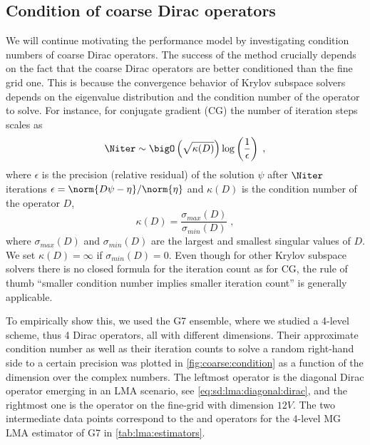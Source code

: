 \subsection{Condition of coarse Dirac operators}
\label{sec:numerics:coarse:condition}

We will continue motivating the performance model by investigating condition numbers of coarse Dirac operators.
The success of the method crucially depends on the fact that the coarse Dirac operators are better conditioned than the fine grid one.
This is because the convergence behavior of Krylov subspace solvers depends on the eigenvalue distribution and the condition number of the operator to solve.
For instance, for conjugate gradient (CG) the number of iteration steps scales as~\cite{shewchuk1994introduction}
\begin{equation}
\Niter \sim \bigO\left(\sqrt{\kappa(D)}\right) \log\left(\frac{1}{\epsilon}\right) \;,
\end{equation}
where $\epsilon$ is the precision (relative residual) of the solution $\psi$ after $\Niter$ iterations $\epsilon = \norm{D \psi - \eta}/\norm{\eta}$ and $\kappa(D)$ is the condition number of the operator $D$,
\begin{equation}
\kappa(D) = \frac{ \sigma_{max}(D) }{ \sigma_{min}(D) } \;,
\end{equation}
where $\sigma_{max}(D)$ and $\sigma_{min}(D)$ are the largest and smallest singular values of $D$.
We set $\kappa(D) = \infty$ if $\sigma_{min}(D) = 0$.
Even though for other Krylov subspace solvers there is no closed formula for the iteration count as for CG, the rule of thumb ``smaller condition number implies smaller iteration count'' is generally applicable.

To empirically show this, we used the G7 ensemble, where we studied a 4-level scheme, thus \num{4} Dirac operators, all with different dimensions.
Their approximate condition number as well as their iteration counts to solve a random right-hand side to a certain precision was plotted in \cref{fig:coarse:condition} as a function of the dimension over the complex numbers.
The leftmost operator is the diagonal Dirac operator emerging in an LMA scenario, see \cref{eq:sd:lma:diagonal:dirac}, and the rightmost one is the operator on the fine-grid with dimension $12 V$.
The two intermediate data points correspond to the  and  operators for the 4-level MG LMA estimator of G7 in \cref{tab:lma:estimators}.

